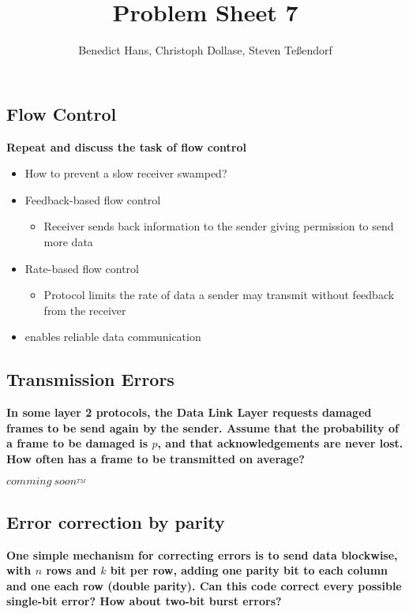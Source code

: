 \documentclass[a4paper,12pt]{article}
\author{Benedict Hans, Christoph Dollase, Steven Te\ss endorf}
\title{ \textbf{Problem Sheet 7}}
\begin{document}
	 
	\maketitle	 %
	
	\subsection{Flow Control}
	\textbf{Repeat and discuss the task of flow control}
	
	\begin{itemize}
		\item How to prevent a slow receiver swamped?
		\item Feedback-based flow control
		\begin{itemize}
			\item Receiver sends back information to the sender giving permission to send more data
		\end{itemize}
		\item Rate-based flow control
		\begin{itemize}
			\item Protocol limits the rate of data a sender may transmit without feedback from the 
			receiver
		\end{itemize}
		\item enables reliable data communication
	\end{itemize}
	
	\subsection{Transmission Errors}
	\textbf{In some layer 2 protocols, the Data Link Layer requests damaged frames to be send again by the sender. Assume that the probability of a frame to be damaged is $p$, and that acknowledgements are never lost.  How often has a frame to be transmitted on average?}
	
	\textit{$comming~ soon^{_{TM}}$}
	
	\subsection{Error correction by parity}
	\textbf{One simple mechanism for correcting errors is to send data blockwise, with	$n$ rows and $k$ bit per row, adding one parity bit to each column and one each row (double parity).  Can this code correct every possible single-bit error? How about two-bit burst errors?}
	
\end{document}
